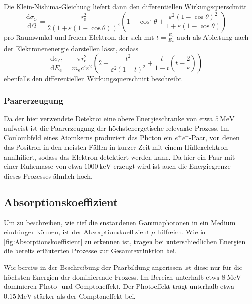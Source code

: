 Die Klein-Nishima-Gleichung liefert dann den differentiellen Wirkungsquerschnitt
\begin{equation}
    \frac{\text{d}\sigma_C}{\text{d}\Omega} = \frac{r_\text{e}^2}{2 (1 + \varepsilon (1 - \cos\theta))^2} 
                                              \left(1 + \cos^2\theta + \frac{\varepsilon^2 (1 - \cos\theta)^2}{1 + \varepsilon (1 - \cos\theta)} \right)
                                              \label{eq:dcrossomega}
\end{equation}
pro Raumwinkel und freiem Elektron, der sich mit $t = \frac{E_\text{e}}{E_\gamma}$ auch als Ableitung nach der Elektronenenergie darstellen lässt, sodass
\begin{equation}
    \frac{\text{d}\sigma_C}{\text{d}E_\text{e}} = \frac{\pi r^2_\text{e}}{m_\text{e} c^2 \varepsilon^2} 
                                                  \left(2 + \frac{t^2}{\varepsilon^2 (1-t)^2} + \frac{t}{1-t} \left(t - \frac{2}{\varepsilon}\right)\right)
    \label{eq:Comptonkontinuum}
\end{equation}
ebenfalls den differentiellen Wirkungsquerschnitt beschreibt \cite{Teilchendetektoren}.

\subsubsection{Paarerzeugung}

Da der hier verwendete Detektor eine obere Energieschranke von etwa $\SI{5}{\mega\eV}$ aufweist ist die Paarerzeugung der höchstenergetische relevante Prozess.
Im Coulombfeld eines Atomkerns produziert das Photon ein $e^+ e^-$-Paar, von denen das Positron in den meisten Fällen in kurzer Zeit mit einem Hüllenelektron annihiliert,
sodass das Elektron detektiert werden kann.
Da hier ein Paar mit einer Ruhemasse von etwa $\SI{1000}{\kilo\eV}$ erzeugt wird ist auch die Energiegrenze dieses Prozesses ähnlich hoch.


\subsection{Absorptionskoeffizient}

Um zu beschreiben, wie tief die enstandenen Gammaphotonen in ein Medium eindringen können, ist der Absorptionskoeffizient $\mu$ hilfreich.
Wie in \autoref{fig:Absorptionskoeffizient} zu erkennen ist, tragen bei unterschiedlichen Energien die bereits erläuterten Prozesse zur Gesamtextinktion bei.

Wie bereits in der Beschreibung der Paarbildung angerissen ist diese nur für die höchsten Energien der dominierende Prozess.
Im Bereich unterhalb etwa $\SI{8}{\mega\eV}$ dominieren Photo- und Comptoneffekt.
Der Photoeffekt trägt unterhalb etwa $\SI{0.15}{\mega\eV}$ stärker als der Comptoneffekt bei. \\

